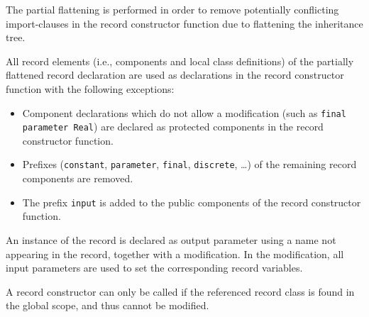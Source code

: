 \begin{nonnormative}
The partial flattening is performed in order to remove potentially conflicting import-clauses in the record constructor function due to flattening the inheritance tree.
\end{nonnormative}

All record elements (i.e., components and local class
definitions) of the partially flattened record declaration are used
as declarations in the record constructor function with the following
exceptions:
\begin{itemize}
\item
  Component declarations which do not allow a modification (such
  as \lstinline!final parameter Real!) are declared
  as protected components in the record constructor function.
\item
  Prefixes (\lstinline!constant!, \lstinline!parameter!, \lstinline!final!, \lstinline!discrete!, \ldots) of the remaining
  record components are removed.
\item
  The prefix \lstinline!input! is added to the public components of the record
  constructor function.
\end{itemize}

An instance of the record is declared as output parameter using
a name not appearing in the record, together with a modification. In
the modification, all input parameters are used to set the corresponding
record variables.

A record constructor can only be called if the referenced record class
is found in the global scope, and thus cannot be modified.

